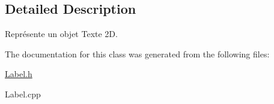 \subsection{Detailed Description}
Représente un objet Texte 2\-D. 

The documentation for this class was generated from the following files\-:\begin{DoxyCompactItemize}
\item 
\hyperlink{Label_8h}{Label.\-h}\item 
Label.\-cpp\end{DoxyCompactItemize}
